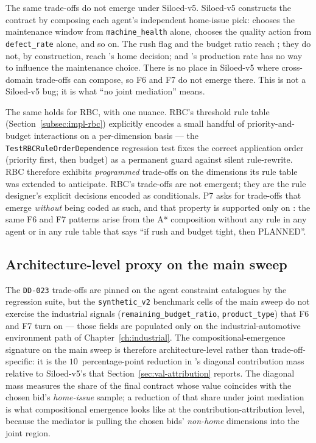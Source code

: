 The same trade-offs do not emerge under Siloed-v5. Siloed-v5
constructs the contract by composing each agent's independent
home-issue pick: \PMA{} chooses the maintenance window from
\texttt{machine\_health} alone, \QCA{} chooses the quality action
from \texttt{defect\_rate} alone, and so on. The rush flag and the
budget ratio reach \PMA{}; they do not, by construction, reach
\QCA{}'s home decision; and \PSA{}'s production rate has no way to
influence the maintenance choice. There is no place in Siloed-v5
where cross-domain trade-offs can compose, so F6 and F7 do not
emerge there. This is not a Siloed-v5 bug; it is what ``no joint
mediation'' means.

The same holds for RBC, with one nuance. RBC's threshold rule table
(Section~\ref{subsec:impl-rbc}) explicitly encodes a small handful
of priority-and-budget interactions on a per-dimension basis ---
the \texttt{TestRBCRuleOrderDependence} regression test fixes the
correct application order (priority first, then budget) as a
permanent guard against silent rule-rewrite. RBC therefore exhibits
\emph{programmed} trade-offs on the dimensions its rule table was
extended to anticipate. RBC's trade-offs are not emergent; they are
the rule designer's explicit decisions encoded as conditionals. P7
asks for trade-offs that emerge \emph{without} being coded as such,
and that property is supported only on \NEXUS{}: the same F6 and F7
patterns arise from the A* composition without any rule in any
agent or in any rule table that says ``if rush and budget tight,
then PLANNED''.

\subsection*{Architecture-level proxy on the main sweep}

The \texttt{DD-023} trade-offs are pinned on the agent constraint
catalogues by the regression suite, but the \texttt{synthetic\_v2}
benchmark cells of the main sweep do not exercise the industrial
signals (\texttt{remaining\_budget\_ratio}, \texttt{product\_type})
that F6 and F7 turn on --- those fields are populated only on the
industrial-automotive environment path of
Chapter~\ref{ch:industrial}. The compositional-emergence signature
on the main sweep is therefore architecture-level rather than
trade-off-specific: it is the $10$~percentage-point reduction in
\NEXUS{}'s diagonal contribution mass relative to Siloed-v5's that
Section~\ref{sec:val-attribution} reports. The diagonal mass measures
the share of the final contract whose value coincides with the
chosen bid's \emph{home-issue} sample; a reduction of that share
under joint mediation is what compositional emergence looks like at
the contribution-attribution level, because the mediator is pulling
the chosen bids' \emph{non-home} dimensions into the joint region.

